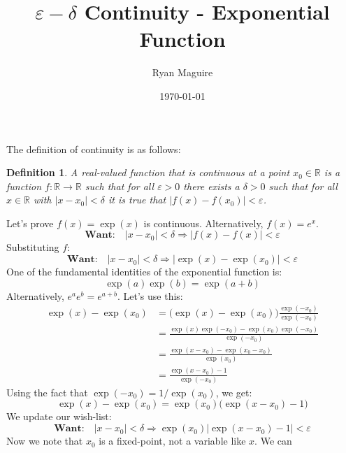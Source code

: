 \documentclass{article}
\title{$\varepsilon-\delta$ Continuity - Exponential Function}
\author{Ryan Maguire}
\date{\today}
\theoremstyle{normal}
\newtheorem{definition}{Definition}
\theoremstyle{plain}
\begin{document}
    \maketitle
    The definition of continuity is as follows:
    \begin{definition}
        A real-valued function that is continuous at a point
        $x_{0}\in\mathbb{R}$ is a function $f:\mathbb{R}\rightarrow\mathbb{R}$
        such that for all $\varepsilon>0$ there exists a $\delta>0$ such that
        for all $x\in\mathbb{R}$ with $|x-x_{0}|<\delta$ it is true that
        $|f(x)-f(x_{0})|<\varepsilon$.
    \end{definition}
    Let's prove $f(x)=\exp(x)$ is continuous. Alternatively, $f(x)=e^{x}$.
    \begin{equation}
        \textbf{Want:}\quad
        |x-x_{0}|<\delta
        \Rightarrow|f(x)-f(x)|<\varepsilon
    \end{equation}
    Substituting $f$:
    \begin{equation}
        \textbf{Want:}\quad
        |x-x_{0}|<\delta
        \Rightarrow
        |\exp(x)-\exp(x_{0})|<\varepsilon
    \end{equation}
    One of the fundamental identities of the exponential function is:
    \begin{equation}
        \exp(a)\exp(b)=\exp(a+b)
    \end{equation}
    Alternatively, $e^{a}e^{b}=e^{a+b}$. Let's use this:
    \begin{align}
        \exp(x)-\exp(x_{0})
            &=\big(\exp(x)-\exp(x_{0})\big)\frac{\exp(-x_{0})}{\exp(-x_{0})}\\
            &=\frac{\exp(x)\exp(-x_{0})-\exp(x_{0})\exp(-x_{0})}{\exp(-x_{0})}\\
            &=\frac{\exp(x-x_{0})-\exp(x_{0}-x_{0})}{\exp(x_{0})}\\
            &=\frac{\exp(x-x_{0})-1}{\exp(-x_{0})}
    \end{align}
    Using the fact that $\exp(-x_{0})=1/\exp(x_{0})$, we get:
    \begin{equation}
        \exp(x)-\exp(x_{0})
        =\exp(x_{0})\big(\exp(x-x_{0})-1\big)
    \end{equation}
    We update our wish-list:
    \begin{equation}
        \textbf{Want:}\quad
        |x-x_{0}|<\delta
        \Rightarrow
        \exp(x_{0})\big|\exp(x-x_{0})-1\big|<\varepsilon
    \end{equation}
    Now we note that $x_{0}$ is a fixed-point, not a variable like $x$. We can
\end{document}
